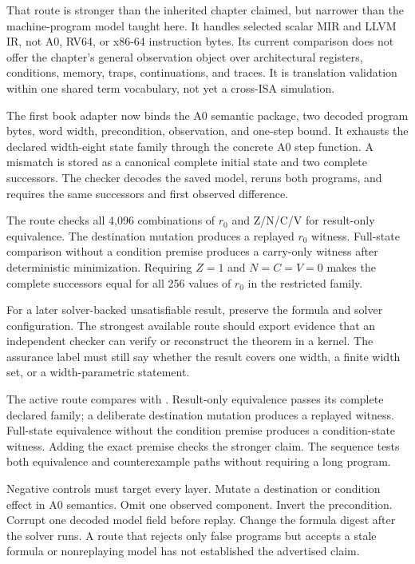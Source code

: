 That route is stronger than the inherited chapter claimed, but narrower than
the machine-program model taught here. It handles selected scalar MIR and LLVM
IR, not A0, RV64, or x86-64 instruction bytes. Its current comparison does not
offer the chapter's general observation object over architectural registers,
conditions, memory, traps, continuations, and traces. It is translation
validation within one shared term vocabulary, not yet a cross-ISA simulation.

The first book adapter now binds the A0 semantic package, two decoded program
bytes, word width, precondition, observation, and one-step bound. It exhausts
the declared width-eight state family through the concrete A0 step function.
A mismatch is stored as a canonical complete initial state and two complete
successors. The checker decodes the saved model, reruns both programs, and
requires the same successors and first observed difference.


The route checks all 4,096 combinations of \(r_0\) and Z/N/C/V for
result-only equivalence. The destination mutation produces a replayed
\(r_0\) witness. Full-state comparison without a condition premise produces
a carry-only witness after deterministic minimization. Requiring
\(Z=1\) and \(N=C=V=0\) makes the complete successors equal for all 256
values of \(r_0\) in the restricted family.

For a later solver-backed unsatisfiable result, preserve the formula and solver configuration.
The strongest available route should export evidence that an independent
checker can verify
or reconstruct the theorem in a kernel. The assurance label must still say
whether the result covers one width, a finite width set, or a width-parametric
statement.

\begin{example}[title={The first A0 equivalence query}]
The active route compares  with .
Result-only equivalence passes its complete declared family; a deliberate
destination mutation produces a replayed witness. Full-state equivalence
without the condition premise produces a condition-state witness. Adding the
exact premise checks the stronger claim. The sequence tests both equivalence
and counterexample paths without requiring a long program.
\end{example}

Negative controls must target every layer. Mutate a destination or condition
effect in A0 semantics. Omit one observed component. Invert the precondition.
Corrupt one decoded model field before replay. Change the formula digest after
the solver runs. A route that rejects only false programs but accepts a stale
formula or nonreplaying model has not established the advertised claim.

